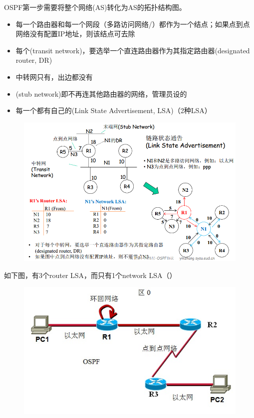 \myhline
OSPF第一步需要将整个网络(AS)转化为AS的拓扑结构图。
\begin{itemize}
	\item 每一个路由器和每一个网段（多路访问网络/）都作为一个结点；如果点到点网络没有配置IP地址，则该结点可去除
	\item 每个(transit network)，要选举一个直连路由器作为其指定路由器(designated router, DR)
	\item 中转网只有，出边都没有
	\item {}(stub network)即不再连其他路由器的网络，管理员设的
	\item 每一个都有自己的(Link State Advertisement, LSA)（2种LSA）
\end{itemize}
\begin{figure}[H]
	\centering
	\includegraphics[width=0.8\linewidth]{fig/LSA-graph.png}
\end{figure}

\begin{example}
	如下图，有3个router LSA，而只有1个network LSA（）
\begin{figure}[H]
	\centering
	\includegraphics[width=0.45\linewidth]{fig/ospf_lsa.jpg}
\end{figure}
\end{example}

